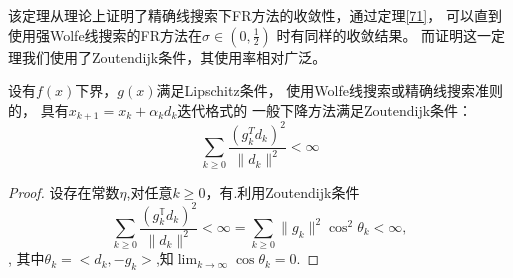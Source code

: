             该定理从理论上证明了精确线搜索下FR方法的收敛性，通过定理\ref{71}，
            可以直到使用强Wolfe线搜索的FR方法在$\sigma\in(0,\frac{1}{2})$
            时有同样的收敛结果。
            而证明这一定理我们使用了Zoutendijk条件，其使用率相对广泛。
        
        \begin{theorem}[Zoutendijk条件]
            设有$f(x)$下界，$g(x)$满足Lipschitz条件，
            使用Wolfe线搜索或精确线搜索准则的，
            具有$x_{k+1}=x_{k}+\alpha_kd_k$迭代格式的
            一般下降方法满足Zoutendijk条件：
            \begin{equation}
            \displaystyle\sum_{k\geq0}\frac{(g_k^Td_k)^2}{\|d_k\|^2}<\infty
            \end{equation}
        \end{theorem}   
        \begin{proof}
            设存在常数$\eta$,对任意$k\geq0$，有.利用Zoutendijk条件
            \begin{equation}
                \displaystyle\sum_{k\geq0}\frac{(g_k^\mathbb{T}d_k)^2}{\|d_k\|^2}<\infty=
                \displaystyle\sum_{k\geq0}\|g_k\|^2\cos^2\theta_k < \infty,
                \nonumber
        	\end{equation},
            其中$\theta_k = <d_k, -g_k>$,知$\displaystyle\lim_{k\to\infty}\cos\theta_k=0$.
            

\end{proof}
